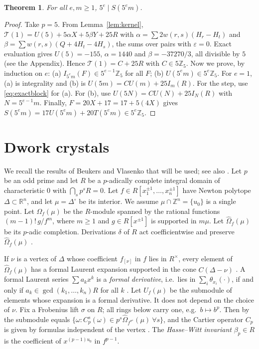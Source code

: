 \documentclass[11pt]{amsart}
\newtheorem{theorem}{Theorem}[section]
\theoremstyle{definition}
\theoremstyle{remark}
\newcommand{\Z}{\mathbb{Z}}
\begin{document}
\begin{theorem}\label{thm:five}
For all $e,m\ge1$, $5^e\mid S(5^em)$.
\end{theorem}
\begin{proof}
Take $p=5$. From Lemma~\ref{lem:kernel},
$\mathcal T(1)=U(5)+5\alpha X+5\beta Y+25R$ with $\alpha=\sum2w(r,s)(H_r-H_t)$ and
$\beta=\sum w(r,s)(Q+4H_t-4H_s)$, the sums over pairs with $\varepsilon=0$. Exact evaluation gives
$U(5)=-155$, $\alpha=1440$ and $\beta=-37270/3$, all divisible by $5$ (see the Appendix). Hence
$\mathcal T(1)=C+25R$ with $C\in5\Z_5$. Now we prove, by induction on $e$:
(a) $I_{5^em}(F)\in5^{e-1}\Z_5$ for all $F$; (b) $U(5^em)\in5^e\Z_5$.
For $e=1$, (a) is integrality and (b) is $U(5m)=CU(m)+25I_m(R)$. For the step, use
\eqref{eq:exactblock} for (a). For (b), use $U(5N)=CU(N)+25I_N(R)$ with $N=5^{e-1}m$.
Finally, $F=20X+17=17+5(4X)$ gives $S(5^em)=17U(5^em)+20T(5^em)\in5^e\Z_5$.
\end{proof}

\section{Dwork crystals}\label{sec:BV}

We recall the results of Beukers and Vlasenko \cite{BV1} that will be used; see also \cite{BV2,BV3}.
Let $p$ be an odd prime and let $R$ be a $p$-adically complete integral domain of characteristic
$0$ with $\bigcap_sp^sR=0$. Let $f\in R[x_1^{\pm1},\dots,x_n^{\pm1}]$ have Newton polytope
$\Delta\subset\mathbb R^n$, and let $\mu=\Delta^\circ$ be its interior. We assume
$\mu\cap\Z^n=\{u_0\}$ is a single point. Let $\Omega_f(\mu)$ be the $R$-module spanned by the
rational functions $(m-1)!\,g/f^m$, where $m\ge1$ and $g\in R[x^{\pm1}]$ is supported in $m\mu$.
Let $\widehat\Omega_f(\mu)$ be its $p$-adic completion. Derivations $\delta$ of $R$ act
coefficientwise and preserve $\widehat\Omega_f(\mu)$ \cite[Prop.~3.4]{BV1}.

If $\nu$ is a vertex of $\Delta$ whose coefficient $f_{[\nu]}$ in $f$ lies in $R^\times$, every
element of $\widehat\Omega_f(\mu)$ has a formal Laurent expansion supported in the cone
$C(\Delta-\nu)$ \cite[\S2]{BV1}. A formal Laurent series $\sum a_kx^k$ is a \emph{formal derivative},
i.e.\ lies in $\sum_i\theta_{x_i}(\cdot)$, if and only if $a_k\in\gcd(k_1,\dots,k_n)R$ for all $k$
\cite[Lemma~2.2]{BV1}. Let $U_f(\mu)$ be the submodule of elements whose expansion is a formal
derivative. It does not depend on the choice of $\nu$. Fix a Frobenius lift $\sigma$ on $R$; all rings below
carry one, e.g.\ $b\mapsto b^p$. Then by \cite[Prop.~4.2]{BV1} the submodule equals
$\{\omega:C_p^s(\omega)\in p^s\widehat\Omega_{f^{\sigma^s}}(\mu)\ \forall s\}$, and the Cartier
operator $C_p$ is given by formulas independent of the vertex \cite[\S3, (4)--(7)]{BV1}. The
\emph{Hasse--Witt invariant} $\beta_p\in R$ is the coefficient of $x^{(p-1)u_0}$ in $f^{p-1}$.
\end{document}
